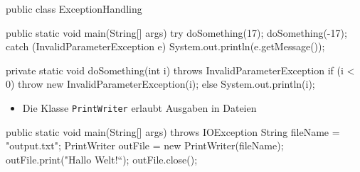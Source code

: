 \documentclass[a4paper,10pt, dvipsnames]{report}
\begin{document}
\begin{javacodebox}
public class ExceptionHandling {

    public static void main(String[] args) {
        try {
            doSomething(17);
            doSomething(-17);
        } catch (InvalidParameterException e) {
            System.out.println(e.getMessage());
        }
    }

    private static void doSomething(int i) throws InvalidParameterException {
        if (i < 0)
            throw new InvalidParameterException(i);
        else
            System.out.println(i);
    }
}
\end{javacodebox}

\begin{itemize}
    \item Die Klasse \texttt{PrintWriter} erlaubt Ausgaben in Dateien
\end{itemize}

\begin{javacodebox}
public static void main(String[] args) throws IOException {
	String fileName = "output.txt";
	PrintWriter outFile = new PrintWriter(fileName);
	outFile.print("Hallo Welt!“);
	outFile.close();
}
\end{javacodebox}
\end{document}
